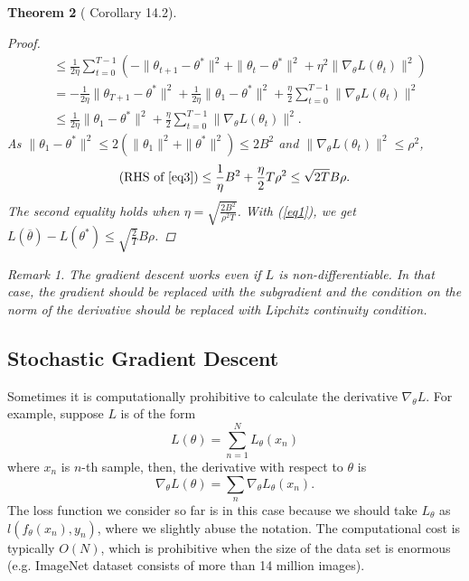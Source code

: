\documentclass{amsart}
\newtheorem{theorem}{Theorem}[section]
\theoremstyle{definition}
\theoremstyle{remark}
\newtheorem{remark}[theorem]{Remark}
\numberwithin{equation}{section}
\begin{document}
\begin{theorem}[\cite{shalev2014understanding} Corollary 14.2]
\begin{proof}
\begin{equation}
\begin{split}
&\leq \frac{1}{2\eta}  \sum_{t=0}^{T-1} \left( -\|\theta_{t+1} - \theta^{\ast}\|^2 + \|\theta_t - \theta^{\ast}\|^2 + \eta^2 \|\nabla_{\theta}L(\theta_t)\|^2\right)\\
&= -\frac{1}{2\eta}\|\theta_{T+1} - \theta^{\ast}\|^2 + \frac{1}{2\eta}\|\theta_1 - \theta^{\ast}\|^2 + \frac{\eta}{2}\sum_{t=0}^{T-1} \|\nabla_{\theta}L(\theta_t)\|^2\\
&\leq \frac{1}{2\eta}\|\theta_1 - \theta^{\ast}\|^2 + \frac{\eta}{2}\sum_{t=0}^{T-1} \|\nabla_{\theta}L(\theta_t)\|^2.
\end{split}
\end{equation}
As $\|\theta_1 - \theta^{\ast}\|^2 \leq 2(\|\theta_1\|^2 + \|\theta^{\ast}\|^2) \leq 2 B^2$ and $\|\nabla_{\theta}L(\theta_t)\|^2 \leq \rho^2$,
\begin{equation}
\begin{split}
\text{(RHS of \ref{eq3})} \leq \frac{1}{\eta}B^2 + \frac{\eta}{2}T\rho^2 \leq \sqrt{2T} B\rho.
\end{split}
\end{equation}
The second equality holds when $\eta = \sqrt{\frac{2B^2}{\rho^2 T}}$.
With (\ref{eq1}), we get $L(\overline{\theta}) - L(\theta^{\ast}) \leq \sqrt{\frac{2}{T}} B\rho$.
\end{proof}
\begin{remark}
The gradient descent works even if $L$ is non-differentiable. In that case, the gradient should be replaced with the subgradient and the condition on the norm of the derivative should be replaced with Lipchitz continuity condition.
\end{remark}
\end{theorem}


\subsection{Stochastic Gradient Descent}

Sometimes it is computationally prohibitive to calculate the derivative $\nabla_\theta L$.
For example, suppose $L$ is of the form
\begin{equation}
L(\theta) = \sum_{n=1}^{N} L_\theta(x_n)
\end{equation}
where $x_n$ is $n$-th sample, then, the derivative with respect to $\theta$ is
\begin{equation}
\nabla_\theta L(\theta) = \sum_{n} \nabla_\theta L_\theta (x_n).
\end{equation}
The loss function we consider so far is in this case because we should take
$L_\theta$ as $l(f_\theta (x_n), y_n)$, where we slightly abuse the notation.
The computational cost is typically $O(N)$, which is prohibitive when
the size of the data set is enormous (e.g. ImageNet\cite{imagenet_cvpr09} dataset consists of more than 14 million images).
\end{document}
